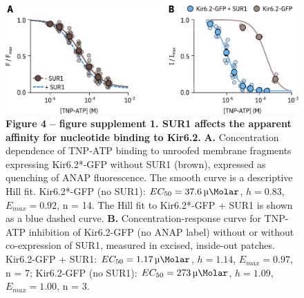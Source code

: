 \documentclass[10pt,lineno, doublespacing]{elife}
\begin{document}
\begin{figure}
\begin{fullwidth}
\centering
\includegraphics[width=\textwidth]{figure_four_s1}
\captionsetup{labelformat=empty}
\caption{
\textbf{Figure 4 -- figure supplement 1. SUR1 affects the apparent affinity for nucleotide binding to Kir6.2.}
\textbf{A.}
Concentration dependence of TNP-ATP binding to unroofed membrane fragments expressing Kir6.2*-GFP without SUR1 (brown), expressed as quenching of ANAP fluorescence.
The smooth curve is a descriptive Hill fit.
Kir6.2*-GFP (no SUR1): $EC_{50} = \SI{37.6}{\micro\Molar}$, $h = 0.83$, $E_{max} = 0.92$, n = 14.
The Hill fit to Kir6.2*-GFP + SUR1 is shown as a blue dashed curve.
\textbf{B.}
Concentration-response curve for TNP-ATP inhibition of Kir6.2-GFP (no ANAP label) without or without co-expression of SUR1, measured in excised, inside-out patches.
Kir6.2-GFP + SUR1: $EC_{50} = \SI{1.17}{\micro\Molar}$, $h = 1.14$, $E_{max} = 0.97$, n = 7; Kir6.2-GFP (no SUR1): $EC_{50} = \SI{273}{\micro\Molar}$, $h = 1.09$, $E_{max} = 1.00$, n = 3.
}
\label{fig:four_s1}
\end{fullwidth}
\end{figure}
\end{document}
